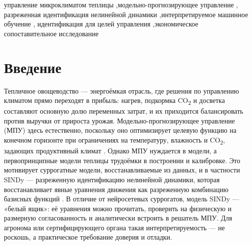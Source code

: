 \documentclass[preprint,3p]{elsarticle}
\begin{document}
\begin{frontmatter}
\begin{abstract}
регуляторами исключает очевидные альтернативные объяснения: оракул по истинной модели
перерасходует ресурсы и не является верхней границей; нормированный PPO улучшается, но не
выигрывает; нейросетевое МПУ — худшее. Следовательно, узким местом не являются ни
недостаточная точность модели, ни интерпретируемость. Доказуемая ценность интерпретируемой
суррогатной модели лежит не в экономическом превосходстве, а в безопасности и защите при
выходе за пределы обучающего распределения. Сделан вывод: экономность модели не тождественна
её интерпретируемости; разреженность недопустимо включать в критерии отбора модели, когда
конечной задачей является управление в замкнутом контуре; предрегистрация, замороженная по
разомкнутому контуру, способна систематически удостоверять катастрофичную для управления
модель.
\end{abstract}

\begin{keyword}
управление микроклиматом теплицы \sep модельно-прогнозирующее управление \sep
разреженная идентификация нелинейной динамики \sep интерпретируемое машинное обучение \sep
идентификация для целей управления \sep экономическое сопоставительное исследование
\end{keyword}

\end{frontmatter}

\section{Введение}
\label{sec:intro}

Тепличное овощеводство — энергоёмкая отрасль, где решения по управлению климатом прямо
переходят в прибыль: нагрев, подкормка CO\textsubscript{2} и досветка составляют основную
долю переменных затрат, и их приходится балансировать против выручки от прироста урожая.
Модельно-прогнозирующее управление (МПУ) здесь естественно, поскольку оно оптимизирует
целевую функцию на конечном горизонте при ограничениях на температуру, влажность и
CO\textsubscript{2}, задающих продуктивный климат
\citep{vanhenten1994thesis,mayne2000constrained,lin2021greenhousempc}. Однако МПУ нуждается
в модели, а первопринципные модели теплицы трудоёмки в построении и калибровке. Это
мотивирует суррогатные модели, восстанавливаемые из данных, и в частности SINDy —
разреженную идентификацию нелинейной динамики, которая восстанавливает явные уравнения
движения как разреженную комбинацию базисных функций
\citep{brunton2016sindy,brunton2016sindyc,kaiser2018sindympc}. В отличие от нейросетевых
суррогатов, модель SINDy — «белый ящик»: её уравнения можно прочитать, проверить на
физическую и размерную согласованность и аналитически встроить в решатель МПУ. Для агронома
или сертифицирующего органа такая интерпретируемость — не роскошь, а практическое требование
доверия и отладки.
\end{document}
